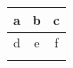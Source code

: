 \documentclass{article}
\begin{document}
\begin{tabular}{c:c|c}
\hdashline
a & b & c\\ \hline
d & e & f\\ \hdashline
\end{tabular}
\end{document}
